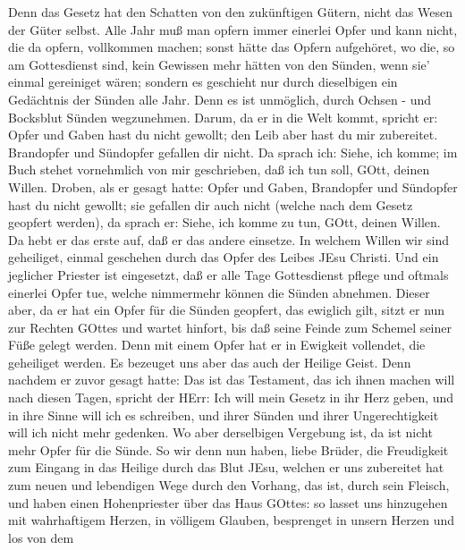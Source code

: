  Denn das Gesetz hat den Schatten von den zukünftigen
Gütern, nicht das Wesen der Güter selbst. Alle Jahr muß man opfern immer
einerlei Opfer und kann nicht, die da opfern, vollkommen machen;
 sonst hätte das Opfern aufgehöret, wo die, so am
Gottesdienst sind, kein Gewissen mehr hätten von den Sünden, wenn sie'
einmal gereiniget wären;  sondern es geschieht nur durch
dieselbigen ein Gedächtnis der Sünden alle Jahr.  Denn es
ist unmöglich, durch Ochsen - und Bocksblut Sünden wegzunehmen.
 Darum, da er in die Welt kommt, spricht er: Opfer und Gaben
hast du nicht gewollt; den Leib aber hast du mir zubereitet.
 Brandopfer und Sündopfer gefallen dir nicht. 
Da sprach ich: Siehe, ich komme; im Buch stehet vornehmlich von mir
geschrieben, daß ich tun soll, GOtt, deinen Willen.  Droben,
als er gesagt hatte: Opfer und Gaben, Brandopfer und Sündopfer hast du
nicht gewollt; sie gefallen dir auch nicht (welche nach dem Gesetz
geopfert werden),  da sprach er: Siehe, ich komme zu tun,
GOtt, deinen Willen. Da hebt er das erste auf, daß er das andere
einsetze.  In welchem Willen wir sind geheiliget, einmal
geschehen durch das Opfer des Leibes JEsu Christi.  Und ein
jeglicher Priester ist eingesetzt, daß er alle Tage Gottesdienst pflege
und oftmals einerlei Opfer tue, welche nimmermehr können die Sünden
abnehmen.  Dieser aber, da er hat ein Opfer für die Sünden
geopfert, das ewiglich gilt, sitzt er nun zur Rechten GOttes
 und wartet hinfort, bis daß seine Feinde zum Schemel
seiner Füße gelegt werden.  Denn mit einem Opfer hat er in
Ewigkeit vollendet, die geheiliget werden.  Es bezeuget uns
aber das auch der Heilige Geist. Denn nachdem er zuvor gesagt hatte:
 Das ist das Testament, das ich ihnen machen will nach
diesen Tagen, spricht der HErr: Ich will mein Gesetz in ihr Herz geben,
und in ihre Sinne will ich es schreiben,  und ihrer Sünden
und ihrer Ungerechtigkeit will ich nicht mehr gedenken.  Wo
aber derselbigen Vergebung ist, da ist nicht mehr Opfer für die Sünde.
 So wir denn nun haben, liebe Brüder, die Freudigkeit zum
Eingang in das Heilige durch das Blut JEsu,  welchen er uns
zubereitet hat zum neuen und lebendigen Wege durch den Vorhang, das ist,
durch sein Fleisch,  und haben einen Hohenpriester über das
Haus GOttes:  so lasset uns hinzugehen mit wahrhaftigem
Herzen, in völligem Glauben, besprenget in unsern Herzen und los von dem

